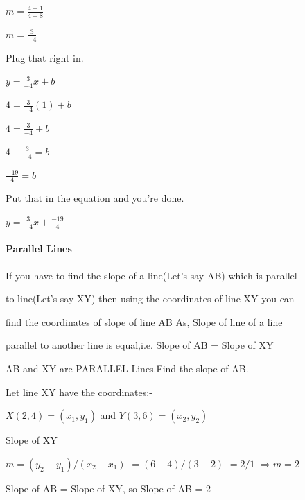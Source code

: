 $m = \frac{4-1}{4-8}$



$m = \frac{3}{-4}$



Plug that right in.



$y = \frac{3}{-4}x+b$



$4 = \frac{3}{-4}(1)+b$



$4 = \frac{3}{-4}+b$



$4-\frac{3}{-4} = b$



$\frac{-19}{4} = b$



Put that in the equation and you're done.



$y = \frac{3}{-4}x + \frac{-19}{4}$



\paragraph{Parallel Lines}



If you have to find the slope of a line(Let's say AB) which is parallel

to line(Let's say XY) then using the coordinates of line XY you can

find the coordinates of slope of line AB As, Slope of line of a line

parallel to another line is equal,i.e. Slope of AB = Slope of XY







AB and XY are PARALLEL Lines.Find the slope of AB.



Let line XY have the coordinates:-



$X(2,4)=(x_1,y_1)$ and $Y(3,6)=(x_2,y_2)$



Slope of XY



$m = (y_2 - y_1)/(x_2-x_1)$ $= (6-4)/(3-2)$ $= 2/1$ $\Rightarrow m = 2$



Slope of AB = Slope of XY, so Slope of AB = 2



